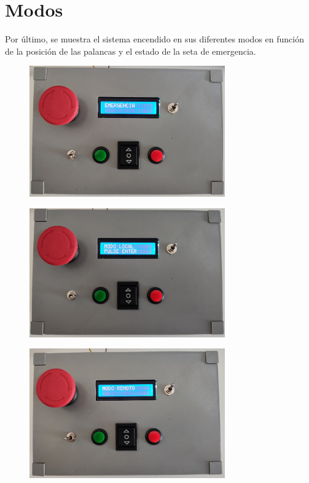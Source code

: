 \section{Modos}

Por último, se muestra el sistema encendido en sus diferentes modos en función de la posición
de las palancas y el estado de la seta de emergencia.

\begin{figure}[hbtp]%
    \centering 
        \includegraphics[width=0.75\textwidth]{07-resultados/modoemer.jpg}
    \caption{}
    \label{fig:modoemer} 
\end{figure}

\begin{figure}[hbtp]%
    \centering 
        \includegraphics[width=0.75\textwidth]{07-resultados/modolocal.jpg}
    \caption{}
    \label{fig:modolocal} 
\end{figure}

\begin{figure}[hbtp]%
    \centering 
        \includegraphics[width=0.75\textwidth]{07-resultados/modoremoto.jpg}
    \caption{}
    \label{fig:modoremoto}
\end{figure}

